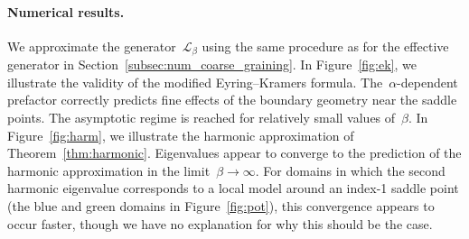 \documentclass[a4]{article}
\newcommand{\cL}{\mathcal{L}}
\newcommand{\1}{\mathbbm 1}
\begin{document}
\paragraph{Numerical results.}
We approximate the generator~$\cL_\beta$ using the same procedure as for the effective generator in Section~\ref{subsec:num_coarse_graining}.
In Figure~\ref{fig:ek}, we illustrate the validity of the modified Eyring--Kramers formula. The~$\alpha$-dependent prefactor correctly predicts fine effects of the boundary geometry near the saddle points. The asymptotic regime is reached for relatively small values of~$\beta$.
In Figure~\ref{fig:harm}, we illustrate the harmonic approximation of Theorem~\ref{thm:harmonic}. Eigenvalues appear to converge to the prediction of the harmonic approximation in the limit~$\beta\to\infty$. For domains in which the second harmonic eigenvalue corresponds to a local model around an index-1 saddle point (the blue and green domains in Figure~\ref{fig:pot}), this convergence appears to occur faster, though we have no explanation for why this should be the case.
\end{document}
